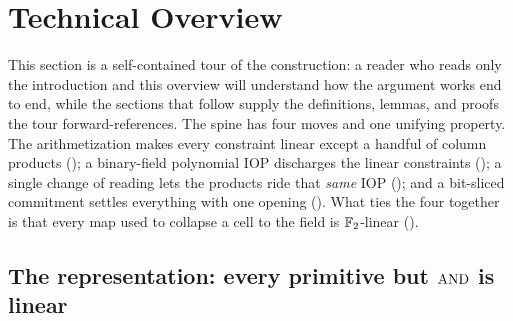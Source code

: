 \section{Technical Overview}
\label{sec:overview}

This section is a self-contained tour of the construction: a reader who
reads only the introduction and this overview will understand how the
argument works end to end, while the sections that follow supply the
definitions, lemmas, and proofs the tour forward-references. The spine has
four moves and one unifying property. The arithmetization makes every
constraint linear except a handful of column products
(); a binary-field polynomial IOP discharges the
linear constraints (); a single change of reading
lets the products ride that \emph{same} IOP (); and
a bit-sliced commitment settles everything with one opening
(). What ties the four together is that every map
used to collapse a cell to the field is $\mathbb{F}_2$-linear
().

\subsection{The representation: every primitive but $\operatorname{AND}$ is linear}
\label{sec:overview-rep}

